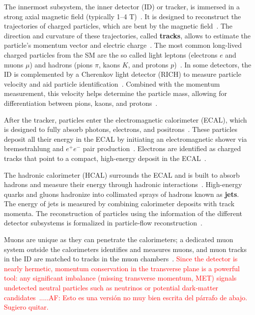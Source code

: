 The innermost subsystem, the inner detector (ID) or tracker, is immersed in a strong axial magnetic field (typically 1--4 T)~\cite{CMS:2008xjf,CMS:TRK2014}. It is designed to reconstruct the trajectories of charged particles, which are bent by the magnetic field~\cite{CMS:TRK2014,CMS:PF2017}. The direction and curvature of these trajectories, called \textbf{tracks}, allows to estimate the  particle's momentum vector and electric charge~\cite{CMS:TRK2014,1674-1137-40-10-100001}. The most common long-lived charged particles from the SM are the so called light leptons (electrons $e$ and muons $\mu$) and hadrons (pions $\pi$, kaons $K$, and protons $p$)~\cite{1674-1137-40-10-100001}. In some detectors, the ID is complemented by a Cherenkov light detector (RICH) to measure particle velocity and aid particle identification~\cite{1674-1137-40-10-100001,Leo_1994}. Combined with the momentum measurement, this velocity helps determine the particle mass, allowing for differentiation between pions, kaons, and protons~\cite{1674-1137-40-10-100001,Leo_1994}.

After the tracker, particles enter the electromagnetic calorimeter (ECAL), which is designed to fully absorb photons, electrons, and positrons~\cite{CMS_EGM_17001,CMS:2008xjf}. These particles deposit all their energy in the ECAL by initiating an electromagnetic shower via bremsstrahlung and $e^{+}e^{-}$ pair production~\cite{CMS_EGM_17001}. Electrons are identified as charged tracks that point to a compact, high-energy deposit in the ECAL~\cite{CMS_EGM_17001}.

The hadronic calorimeter (HCAL) surrounds the ECAL and is built to absorb hadrons and measure their energy through hadronic interactions~\cite{CMS:2008xjf,deFavereau:2013fsa}. High-energy quarks and gluons hadronize into collimated sprays of hadrons known as \textbf{jets}. The energy of jets is measured by combining calorimeter deposits with track momenta. The reconstruction of particles using the information of the different detector subsystems is formalized in particle‑flow reconstruction~\cite{CMS:PF2017,Cacciari:2011ma,Cacciari:2008gp}.

Muons are unique as they can penetrate the calorimeters; a dedicated muon system outside the calorimeters identifies and measures muons, and muon tracks in the ID are matched to tracks in the muon chambers~\cite{CMS_MUON_17001,CMS:2008xjf}. \textcolor{red}{Since the detector is nearly hermetic, momentum conservation in the transverse plane is a powerful tool: any significant imbalance (missing transverse momentum, MET) signals undetected neutral particles such as neutrinos or potential dark‑matter candidates~\cite{CMS:2019ctu,CMS:PF2017}.....AF: Esto es una versión no muy bien escrita del párrafo de abajo. Sugiero quitar.}


